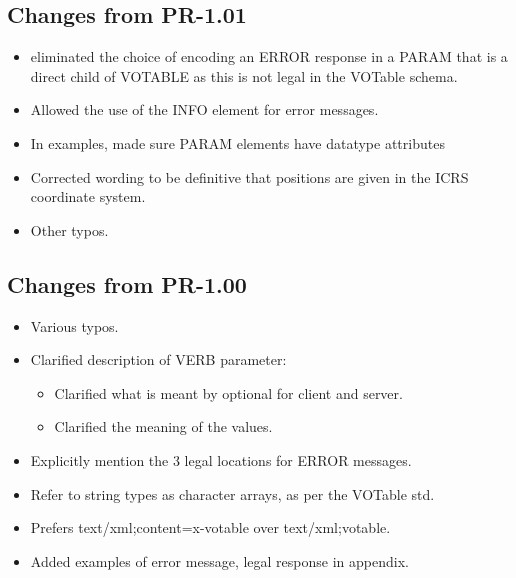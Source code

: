 \documentclass[11pt,a4paper]{ivoa}
\begin{document}
\subsection{Changes from PR-1.01}
\begin{itemize}[noitemsep]
	\item eliminated the choice of encoding an ERROR response in a PARAM
that is a direct child of VOTABLE as this is not legal in the VOTable
schema.
	\item Allowed the use of the INFO element for error messages.
	\item In examples, made sure PARAM elements have datatype attributes
	\item Corrected wording to be definitive that positions are given in the ICRS coordinate system.
	\item Other typos.
\end{itemize}

\subsection{Changes from PR-1.00}
\begin{itemize}[noitemsep]
	\item Various typos.
	\item Clarified description of VERB parameter:
	\begin{itemize}[noitemsep]
		\item Clarified what is meant by optional for client and server.
		\item Clarified the meaning of the values.
	\end{itemize}
	\item Explicitly mention the 3 legal locations for ERROR messages.
	\item Refer to string types as character arrays, as per the VOTable std.
	\item Prefers text/xml;content=x-votable over text/xml;votable.
	\item Added examples of error message, legal response in appendix.
\end{itemize}
\end{document}
